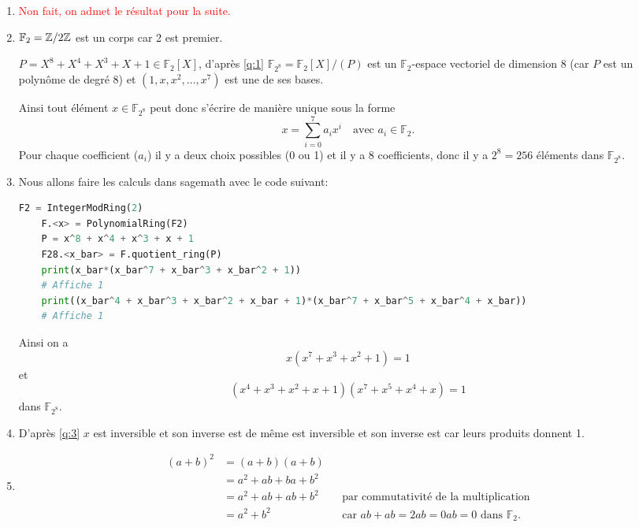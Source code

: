 \documentclass[a4paper, 12pt]{article}
\begin{document}
\begin{enumerate}[label=\textbf{Question \arabic*.}, leftmargin=*]

    \item\label{q:1} \textcolor{red}{Non fait, on admet le résultat pour la suite.}

    \item $\mathbb{F}_2 = \mathbb{Z}/2\mathbb{Z}$ est un corps car 2 est premier.
    
    $P = X^8 + X^4 + X^3 + X + 1 \in \mathbb{F}_2[X]$, d'après \ref{q:1}
    $\mathbb{F}_{2^8} = \mathbb{F}_2[X]/(P)$ est un $\mathbb{F}_2$-espace vectoriel de dimension 8
(car $P$ est un polynôme de degré 8) et $(1, x, x^2, \ldots, x^7)$ est une de ses bases.

Ainsi tout élément $x \in \mathbb{F}_{2^8}$ peut donc s'écrire de manière unique sous la forme
$$
x = \sum\limits_{i=0}^7 a_i x^i \quad \text{avec } a_i \in \mathbb{F}_2.
$$
Pour chaque coefficient ($a_i$) il y a deux choix possibles (0 ou 1) et il y a 8 coefficients, donc il y a $2^8 = 256$ éléments dans $\mathbb{F}_{2^8}$.

    \item\label{q:3} Nous allons faire les calculs dans sagemath avec le code suivant:
\begin{lstlisting}[language=Python]
    F2 = IntegerModRing(2)
    F.<x> = PolynomialRing(F2)
    P = x^8 + x^4 + x^3 + x + 1
    F28.<x_bar> = F.quotient_ring(P)
    print(x_bar*(x_bar^7 + x_bar^3 + x_bar^2 + 1))
    # Affiche 1
    print((x_bar^4 + x_bar^3 + x_bar^2 + x_bar + 1)*(x_bar^7 + x_bar^5 + x_bar^4 + x_bar))
    # Affiche 1
\end{lstlisting}
Ainsi on a 
$$x(x^7 + x^3 + x^2 + 1) = 1$$
et
$$(x^4 + x^3 + x^2 + x + 1)(x^7 + x^5 + x^4 + x) = 1$$
dans $\mathbb{F}_{2^8}$.

    \item D'après \ref{q:3} $x$ est inversible et son inverse est  de même
 est inversible et son inverse est  car leurs produits donnent 1.

    \item\label{q:5}
\[
\begin{aligned}
(a+b)^2 &= (a+b)(a+b) \\
        &= a^2 + ab + ba + b^2 \\
        &= a^2 + ab + ab + b^2
        && \text{par commutativité de la multiplication} \\
        &= a^2 + b^2
        && \text{car } ab + ab = 2ab = 0ab = 0 \text{ dans } \mathbb{F}_2.
\end{aligned}
\]


\end{enumerate}
\end{document}
